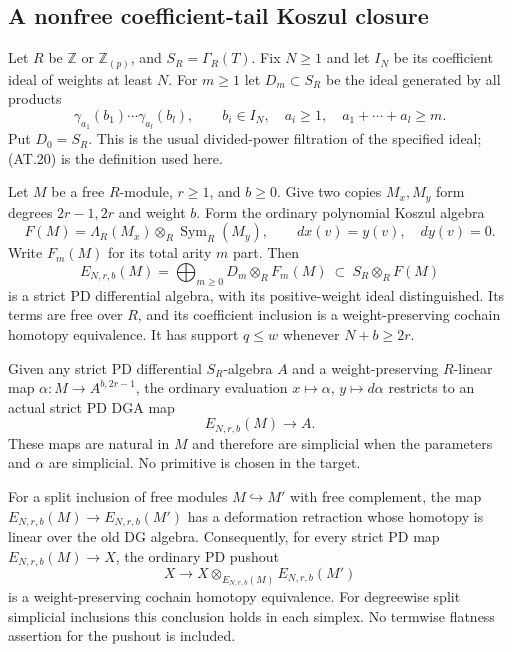 \subsection{A nonfree coefficient-tail Koszul closure}

Let $R$ be $\mathbb Z$ or $\mathbb Z_{(p)}$, and
$S_R=\Gamma_R(T)$. Fix $N\geq1$ and let $I_N$ be
its coefficient ideal of weights at least $N$.
For $m\geq1$ let $D_m\subset S_R$ be the ideal
generated by all products
\[
 \gamma_{a_1}(b_1)\cdots\gamma_{a_l}(b_l),
 \qquad b_i\in I_N,\quad a_i\geq1,
 \quad a_1+\cdots+a_l\geq m.
 \tag{AT.20}
\]
Put $D_0=S_R$. This is the usual divided-power
filtration of the specified ideal; (AT.20) is the
definition used here.

\begin{theorem}
\label{AT10}
Let $M$ be a free $R$-module, $r\geq1$, and $b\geq0$.
Give two copies $M_x,M_y$ form degrees $2r-1,2r$
and weight $b$. Form the ordinary polynomial Koszul
algebra
\[
 F(M)=\Lambda_R(M_x)\otimes_R\operatorname{Sym}_R(M_y),
 \qquad dx(v)=y(v),\quad dy(v)=0.
\]
Write $F_m(M)$ for its total arity $m$ part.
Then
\[
 E_{N,r,b}(M)
   =\bigoplus_{m\geq0}D_m\otimes_R F_m(M)
       \ \subset\ S_R\otimes_R F(M)
 \tag{AT.21}
\]
is a strict PD differential algebra, with its
positive-weight ideal distinguished. Its terms
are free over $R$, and its coefficient inclusion
is a weight-preserving cochain homotopy equivalence.
It has support $q\leq w$ whenever $N+b\geq2r$.

Given any strict PD differential $S_R$-algebra $A$
and a weight-preserving $R$-linear map
$\alpha:M\to A^{b,2r-1}$, the ordinary evaluation
$x\mapsto\alpha$, $y\mapsto d\alpha$ restricts to
an actual strict PD DGA map
\[
 E_{N,r,b}(M)\longrightarrow A.
 \tag{AT.22}
\]
These maps are natural in $M$ and therefore are
simplicial when the parameters and $\alpha$ are
simplicial. No primitive is chosen in the target.

For a split inclusion of free modules $M\hookrightarrow M'$
with free complement, the map
$E_{N,r,b}(M)\to E_{N,r,b}(M')$ has a deformation
retraction whose homotopy is linear over the old
DG algebra. Consequently, for every strict PD map
$E_{N,r,b}(M)\to X$, the ordinary PD pushout
\[
 X\longrightarrow X\otimes_{E_{N,r,b}(M)}E_{N,r,b}(M')
 \tag{AT.23}
\]
is a weight-preserving cochain homotopy equivalence.
For degreewise split simplicial inclusions this
conclusion holds in each simplex. No termwise
flatness assertion for the pushout is included.
\end{theorem}

